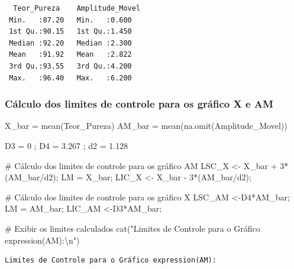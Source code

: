 \documentclass[
  letterpaper,
  DIV=11,
  numbers=noendperiod]{scrartcl}
\newenvironment{Shaded}{\begin{snugshade}}{\end{snugshade}}
\newcommand{\CommentTok}[1]{\textcolor[rgb]{0.37,0.37,0.37}{#1}}
\newcommand{\DecValTok}[1]{\textcolor[rgb]{0.68,0.00,0.00}{#1}}
\newcommand{\FloatTok}[1]{\textcolor[rgb]{0.68,0.00,0.00}{#1}}
\newcommand{\FunctionTok}[1]{\textcolor[rgb]{0.28,0.35,0.67}{#1}}
\newcommand{\NormalTok}[1]{\textcolor[rgb]{0.00,0.23,0.31}{#1}}
\newcommand{\OtherTok}[1]{\textcolor[rgb]{0.00,0.23,0.31}{#1}}
\newcommand{\SpecialCharTok}[1]{\textcolor[rgb]{0.37,0.37,0.37}{#1}}
\newcommand{\StringTok}[1]{\textcolor[rgb]{0.13,0.47,0.30}{#1}}
\begin{document}
\begin{verbatim}
  Teor_Pureza    Amplitude_Movel
 Min.   :87.20   Min.   :0.600  
 1st Qu.:90.15   1st Qu.:1.450  
 Median :92.20   Median :2.300  
 Mean   :91.92   Mean   :2.822  
 3rd Qu.:93.55   3rd Qu.:4.200  
 Max.   :96.40   Max.   :6.200  
\end{verbatim}

\subsubsection{Cálculo dos limites de controle para os gráfico X e
AM}\label{cuxe1lculo-dos-limites-de-controle-para-os-gruxe1fico-x-e-am}

\begin{Shaded}
\begin{Highlighting}[]
\NormalTok{X\_bar }\OtherTok{=} \FunctionTok{mean}\NormalTok{(Teor\_Pureza)}
\NormalTok{AM\_bar }\OtherTok{=} \FunctionTok{mean}\NormalTok{(}\FunctionTok{na.omit}\NormalTok{(Amplitude\_Movel))}

\NormalTok{D3 }\OtherTok{=} \DecValTok{0}\NormalTok{ ; D4 }\OtherTok{=} \FloatTok{3.267}\NormalTok{ ; d2 }\OtherTok{=} \FloatTok{1.128}
  
\CommentTok{\# Cálculo dos limites de controle para os gráfico AM}
\NormalTok{LSC\_X }\OtherTok{\textless{}{-}}\NormalTok{ X\_bar }\SpecialCharTok{+} \DecValTok{3}\SpecialCharTok{*}\NormalTok{(AM\_bar}\SpecialCharTok{/}\NormalTok{d2);}
\NormalTok{LM }\OtherTok{=}\NormalTok{ X\_bar;}
\NormalTok{LIC\_X }\OtherTok{\textless{}{-}}\NormalTok{ X\_bar }\SpecialCharTok{{-}} \DecValTok{3}\SpecialCharTok{*}\NormalTok{(AM\_bar}\SpecialCharTok{/}\NormalTok{d2);}

\CommentTok{\# Cálculo dos limites de controle para os gráfico X}
\NormalTok{LSC\_AM }\OtherTok{\textless{}{-}}\NormalTok{D4}\SpecialCharTok{*}\NormalTok{AM\_bar;}
\NormalTok{LM }\OtherTok{=}\NormalTok{ AM\_bar;}
\NormalTok{LIC\_AM }\OtherTok{\textless{}{-}}\NormalTok{D3}\SpecialCharTok{*}\NormalTok{AM\_bar;}

\CommentTok{\# Exibir os limites calculados}
\FunctionTok{cat}\NormalTok{(}\StringTok{"Limites de Controle para o Gráfico expression(AM):}\SpecialCharTok{\textbackslash{}n}\StringTok{"}\NormalTok{)}
\end{Highlighting}
\end{Shaded}

\begin{verbatim}
Limites de Controle para o Gráfico expression(AM):
\end{verbatim}
\end{document}
